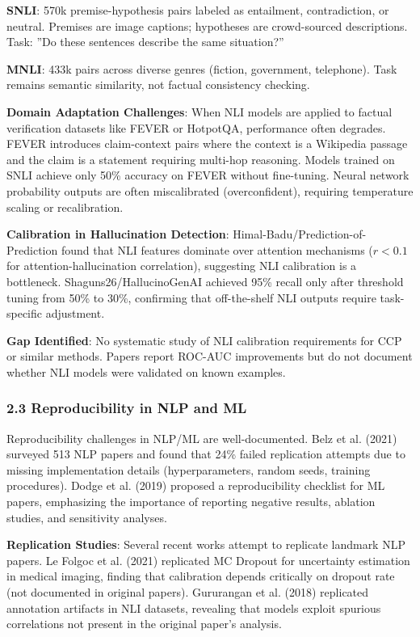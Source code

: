 \textbf{SNLI}: 570k premise-hypothesis pairs labeled as entailment, contradiction, or neutral. Premises are image captions; hypotheses are crowd-sourced descriptions. Task: ''Do these sentences describe the same situation?''

\textbf{MNLI}: 433k pairs across diverse genres (fiction, government, telephone). Task remains semantic similarity, not factual consistency checking.

\textbf{Domain Adaptation Challenges}: When NLI models are applied to factual verification datasets like FEVER or HotpotQA, performance often degrades. FEVER introduces claim-context pairs where the context is a Wikipedia passage and the claim is a statement requiring multi-hop reasoning. Models trained on SNLI achieve only 50\% accuracy on FEVER without fine-tuning. Neural network probability outputs are often miscalibrated (overconfident), requiring temperature scaling or recalibration.

\textbf{Calibration in Hallucination Detection}: Himal-Badu/Prediction-of-Prediction found that NLI features dominate over attention mechanisms ($r < 0.1$ for attention-hallucination correlation), suggesting NLI calibration is a bottleneck. Shaguns26/HallucinoGenAI achieved 95\% recall only after threshold tuning from 50\% to 30\%, confirming that off-the-shelf NLI outputs require task-specific adjustment.

\textbf{Gap Identified}: No systematic study of NLI calibration requirements for CCP or similar methods. Papers report ROC-AUC improvements but do not document whether NLI models were validated on known examples.

\subsubsection{2.3 Reproducibility in NLP and ML}

Reproducibility challenges in NLP/ML are well-documented. Belz et al. (2021) surveyed 513 NLP papers and found that 24\% failed replication attempts due to missing implementation details (hyperparameters, random seeds, training procedures). Dodge et al. (2019) proposed a reproducibility checklist for ML papers, emphasizing the importance of reporting negative results, ablation studies, and sensitivity analyses.

\textbf{Replication Studies}: Several recent works attempt to replicate landmark NLP papers. Le Folgoc et al. (2021) replicated MC Dropout for uncertainty estimation in medical imaging, finding that calibration depends critically on dropout rate (not documented in original papers). Gururangan et al. (2018) replicated annotation artifacts in NLI datasets, revealing that models exploit spurious correlations not present in the original paper's analysis.

